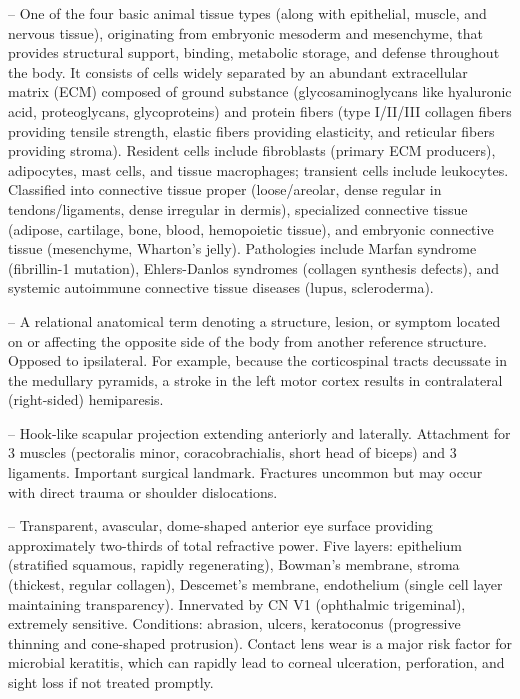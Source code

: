 -- One of the four basic animal tissue types (along with epithelial, muscle, and nervous tissue), originating from embryonic mesoderm and mesenchyme, that provides structural support, binding, metabolic storage, and defense throughout the body. It consists of cells widely separated by an abundant extracellular matrix (ECM) composed of ground substance (glycosaminoglycans like hyaluronic acid, proteoglycans, glycoproteins) and protein fibers (type I/II/III collagen fibers providing tensile strength, elastic fibers providing elasticity, and reticular fibers providing stroma). Resident cells include fibroblasts (primary ECM producers), adipocytes, mast cells, and tissue macrophages; transient cells include leukocytes. Classified into connective tissue proper (loose/areolar, dense regular in tendons/ligaments, dense irregular in dermis), specialized connective tissue (adipose, cartilage, bone, blood, hemopoietic tissue), and embryonic connective tissue (mesenchyme, Wharton's jelly). Pathologies include Marfan syndrome (fibrillin-1 mutation), Ehlers-Danlos syndromes (collagen synthesis defects), and systemic autoimmune connective tissue diseases (lupus, scleroderma).

-- A relational anatomical term denoting a structure, lesion, or symptom located on or affecting the opposite side of the body from another reference structure. Opposed to ipsilateral. For example, because the corticospinal tracts decussate in the medullary pyramids, a stroke in the left motor cortex results in contralateral (right-sided) hemiparesis.

-- Hook-like scapular projection extending anteriorly and laterally. Attachment for 3 muscles (pectoralis minor, coracobrachialis, short head of biceps) and 3 ligaments. Important surgical landmark. Fractures uncommon but may occur with direct trauma or shoulder dislocations.

-- Transparent, avascular, dome-shaped anterior eye surface providing approximately two-thirds of total refractive power. Five layers: epithelium (stratified squamous, rapidly regenerating), Bowman's membrane, stroma (thickest, regular collagen), Descemet's membrane, endothelium (single cell layer maintaining transparency). Innervated by CN V1 (ophthalmic trigeminal), extremely sensitive. Conditions: abrasion, ulcers, keratoconus (progressive thinning and cone-shaped protrusion). Contact lens wear is a major risk factor for microbial keratitis, which can rapidly lead to corneal ulceration, perforation, and sight loss if not treated promptly.

